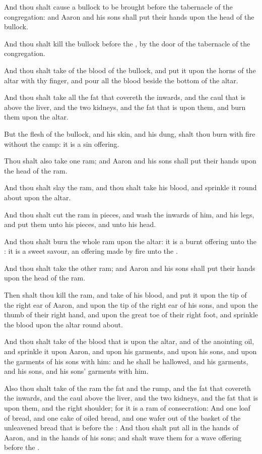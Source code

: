 \verse And thou shalt cause a bullock to be brought before the tabernacle of the congregation: and Aaron and his sons shall put their hands upon the head of the bullock.

\verse And thou shalt kill the bullock before the \LORD, by the door of the tabernacle of the congregation.

\verse And thou shalt take of the blood of the bullock, and put it upon the horns of the altar with thy finger, and pour all the blood beside the bottom of the altar.

\verse And thou shalt take all the fat that covereth the inwards, and the caul that is above the liver, and the two kidneys, and the fat that is upon them, and burn them upon the altar.

\verse But the flesh of the bullock, and his skin, and his dung, shalt thou burn with fire without the camp: it is a sin offering.

\verse Thou shalt also take one ram; and Aaron and his sons shall put their hands upon the head of the ram.

\verse And thou shalt slay the ram, and thou shalt take his blood, and sprinkle it round about upon the altar.

\verse And thou shalt cut the ram in pieces, and wash the inwards of him, and his legs, and put them unto his pieces, and unto his head.

\verse And thou shalt burn the whole ram upon the altar: it is a burnt offering unto the \LORD: it is a sweet savour, an offering made by fire unto the \LORD.

\verse And thou shalt take the other ram; and Aaron and his sons shall put their hands upon the head of the ram.

\verse Then shalt thou kill the ram, and take of his blood, and put it upon the tip of the right ear of Aaron, and upon the tip of the right ear of his sons, and upon the thumb of their right hand, and upon the great toe of their right foot, and sprinkle the blood upon the altar round about.

\verse And thou shalt take of the blood that is upon the altar, and of the anointing oil, and sprinkle it upon Aaron, and upon his garments, and upon his sons, and upon the garments of his sons with him: and he shall be hallowed, and his garments, and his sons, and his sons' garments with him.

\verse Also thou shalt take of the ram the fat and the rump, and the fat that covereth the inwards, and the caul above the liver, and the two kidneys, and the fat that is upon them, and the right shoulder; for it is a ram of consecration: \verse And one loaf of bread, and one cake of oiled bread, and one wafer out of the basket of the unleavened bread that is before the \LORD: \verse And thou shalt put all in the hands of Aaron, and in the hands of his sons; and shalt wave them for a wave offering before the \LORD.

